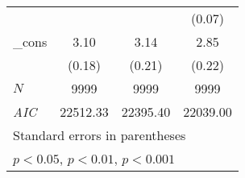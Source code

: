 {\begin{tabular}{l*{3}{c}}
            &                     &                     &      (0.07)         \\
[1em]
\_cons      &        3.10\sym{***}&        3.14\sym{***}&        2.85\sym{***}\\
            &      (0.18)         &      (0.21)         &      (0.22)         \\
\hline
\(N\)       &        9999         &        9999         &        9999         \\
\textit{AIC}&    22512.33         &    22395.40         &    22039.00         \\
\hline\hline
\multicolumn{4}{l}{\footnotesize Standard errors in parentheses}\\
\multicolumn{4}{l}{\footnotesize \sym{*} \(p<0.05\), \sym{**} \(p<0.01\), \sym{***} \(p<0.001\)}\\
\end{tabular}
}
